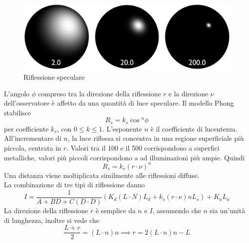\documentclass[9pt,a4paper,twoside]{tau}
\begin{document}
\begin{enumerate}
		\begin{figure}[H]
	        \centering
	        \includegraphics[width=0.6\columnwidth]{Figures/06.png}
	        \caption{Riflessione speculare}
	        \label{fig:figure}
		\end{figure} 
		L'angolo $\phi$ compreso tra la direzione della riflessione $r$ e la direzione $\nu$ dell'osservatore è affetto da una quantità di luce speculare. Il modello Phong stabilisce
		\begin{equation*}
			R_s = k_s \cos{^n}{\phi}
		\end{equation*}
		per coefficiente $k_s$, con $0 \leq k \leq 1$. L'esponente $n$ è il coefficiente di lucentezza. All'incrementare di $n$, la luce riflessa si concentra in una regione superficiale più piccola, centrata in $r$. Valori tra il 100 e il 500 corrispondono a superfici metalliche, valori più piccoli corrispondono a ad illuminazioni più ampie. Quindi
		\begin{equation*}
			R_s = k_s(r \cdot \nu )^n
		\end{equation*}
		Una distanza viene moltiplicata similmente alle riflessioni diffuse.\\
		La combinazione di tre tipi di riflessione danno
		\begin{equation*}
			I=\frac{1}{A + BD + C(D \cdot D)}(K_d(L \cdot N)L_d + k_s(r \cdot \nu)nL_s) + K_aL_a
		\end{equation*}
		La direzione della riflessione $r$ è semplice da $n$ e $I$, assumendo che $n$ sia un'unità di lunghezza, inoltre si vede che
		\begin{equation*}
			\frac{L+r}{2}=(L \cdot n)n \implies r = 2(L \cdot n)n - L
		\end{equation*}
\end{enumerate}
\end{document}
